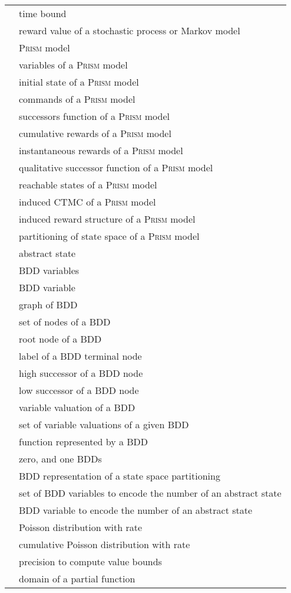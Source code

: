 \documentclass[10pt,twocolumn]{article}
\newcommand{\PRISM}{\textsc{Prism}\xspace}
\begin{document}
\begin{supertabular}{p{1.6cm}p{5.7cm}}
   & time bound\\
   & reward value of a stochastic process or Markov model\\
   & \PRISM model\\
   & variables of a \PRISM model\\
   & initial state of a \PRISM model\\
   & commands of a \PRISM model\\
   & successors function of a \PRISM model\\
   & cumulative rewards of a \PRISM model\\
   & instantaneous rewards of a \PRISM model\\
   & qualitative successor function of a \PRISM model\\
   & reachable states of a \PRISM model\\
   & induced CTMC of a \PRISM model\\
   & induced reward structure of a \PRISM model\\
   & partitioning of state space of a \PRISM model\\
   & abstract state\\
   & BDD variables\\
   & BDD variable\\
   & graph of BDD\\
   & set of nodes of a BDD\\
   & root node of a BDD\\
   & label of a BDD terminal node \\
   & high successor of a BDD node \\
   & low successor of a BDD node \\
   & variable valuation of a BDD\\
   & set of variable valuations of a given BDD\\
   & function represented by a BDD \\
   & zero, and one BDDs\\
   & BDD representation of a state space partitioning\\
   & set of BDD variables to encode the number of an abstract state\\
   & BDD variable to encode the number of an abstract state\\
   & Poisson distribution with rate \\
   & cumulative Poisson distribution with rate \\
   & precision to compute value bounds\\
   & domain of a partial function\\
\end{supertabular}
\end{document}
